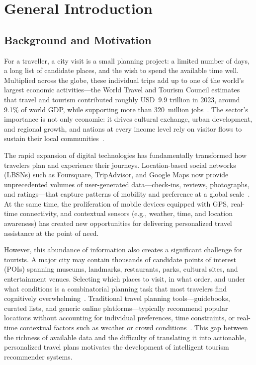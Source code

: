\chapter{General Introduction}
\label{ch:introduction}

\section{Background and Motivation}
\label{sec:intro-background}

For a traveller, a city visit is a small planning project: a limited number of days, a long list of candidate places, and the wish to spend the available time well. Multiplied across the globe, these individual trips add up to one of the world's largest economic activities---the World Travel and Tourism Council estimates that travel and tourism contributed roughly USD~9.9 trillion in 2023, around 9.1\% of world GDP, while supporting more than 320~million jobs~\cite{wttc2024}. The sector's importance is not only economic: it drives cultural exchange, urban development, and regional growth, and nations at every income level rely on visitor flows to sustain their local communities~\cite{unwto2024}.

The rapid expansion of digital technologies has fundamentally transformed how travelers plan and experience their journeys. Location-based social networks (LBSNs) such as Foursquare, TripAdvisor, and Google Maps now provide unprecedented volumes of user-generated data---check-ins, reviews, photographs, and ratings---that capture patterns of mobility and preference at a global scale~\cite{werneck2021poi}. At the same time, the proliferation of mobile devices equipped with GPS, real-time connectivity, and contextual sensors (e.g., weather, time, and location awareness) has created new opportunities for delivering personalized travel assistance at the point of need.

However, this abundance of information also creates a significant challenge for tourists. A major city may contain thousands of candidate points of interest (POIs) spanning museums, landmarks, restaurants, parks, cultural sites, and entertainment venues. Selecting which places to visit, in what order, and under what conditions is a combinatorial planning task that most travelers find cognitively overwhelming~\cite{gavalas2014ttdp}. Traditional travel planning tools---guidebooks, curated lists, and generic online platforms---typically recommend popular locations without accounting for individual preferences, time constraints, or real-time contextual factors such as weather or crowd conditions~\cite{lim2018survey}. This gap between the richness of available data and the difficulty of translating it into actionable, personalized travel plans motivates the development of intelligent tourism recommender systems.

